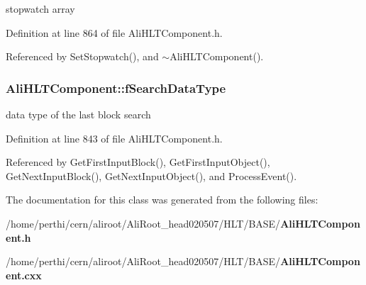 stopwatch array 

Definition at line 864 of file Ali\-HLTComponent.h.

Referenced by Set\-Stopwatch(), and $\sim$Ali\-HLTComponent().
\subsubsection{ {\bf Ali\-HLTComponent::f\-Search\-Data\-Type}\hspace{0.3cm}{\tt  [private]}}\label{classAliHLTComponent_r7}


data type of the last block search 

Definition at line 843 of file Ali\-HLTComponent.h.

Referenced by Get\-First\-Input\-Block(), Get\-First\-Input\-Object(), Get\-Next\-Input\-Block(), Get\-Next\-Input\-Object(), and Process\-Event().

The documentation for this class was generated from the following files:\begin{CompactItemize}
\item 
/home/perthi/cern/aliroot/Ali\-Root\_\-head020507/HLT/BASE/{\bf Ali\-HLTComponent.h}\item 
/home/perthi/cern/aliroot/Ali\-Root\_\-head020507/HLT/BASE/{\bf Ali\-HLTComponent.cxx}\end{CompactItemize}
